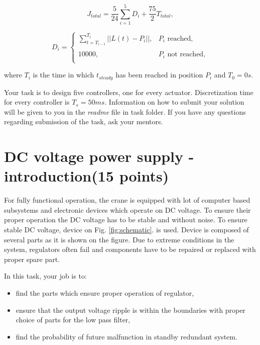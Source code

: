 \documentclass[openany]{book}
\begin{document}
	\begin{equation} \label{eq:total_cost}
	J_{total} = \frac{5}{24}\sum_{i=1}^{5} D_i + \frac{75}{2} T_{total},
	\end{equation}
	
	\begin{equation} \label{eq:distance_cost}
	D_i = \left\{
	\begin{array}{ll}
	\sum_{t=T_{i-1}}^{T_{i}} ||L(t) - P_i||, &  P_i \textrm{ reached}, \\
	& \\
	10000, &  P_i \textrm{ not reached},\\
	\end{array} 
	\right.
	\end{equation}
	
	\noindent
	where $T_i$ is the time in which $t_{steady}$ has been reached in position 
	$P_i$ and $T_0 = 0s$.
	
	\vspace{10pt}
	\noindent
	Your task is to design five controllers, one for every actuator. 
	Discretization time for every controller is $T_s = 50ms$. Information on 
	how to submit your solution will be given to you in the \textit{readme} 
	file in task folder. If you have any questions regarding submission of the 
	task, ask your mentors.
	
	\newpage
	\section{DC voltage power supply - introduction(15 points)}
	
	
	For fully functional operation, the crane is equipped with 
	lot of computer based subsystems and electronic devices which operate on DC 
	voltage. To ensure their proper operation the DC voltage has to be stable 
	and 
	without noise. To ensure stable DC voltage, device on Fig. 
	\ref{fig:schematic}. is used. Device is composed of several parts as it is 
	shown on the figure. Due to extreme conditions in the system, regulators 
	often 
	fail and components have to be repaired or replaced with proper spare part.
	
	In this task, your job is to:
	\begin{itemize}
		\item find the parts which ensure proper operation of regulator, 
		\item ensure that the output voltage ripple is within the boundaries 
		with 
		proper choice of parts for the low pass filter,
		\item find the probability of future malfunction in standby redundant 
		system.
	\end{itemize}
	
\end{document}
